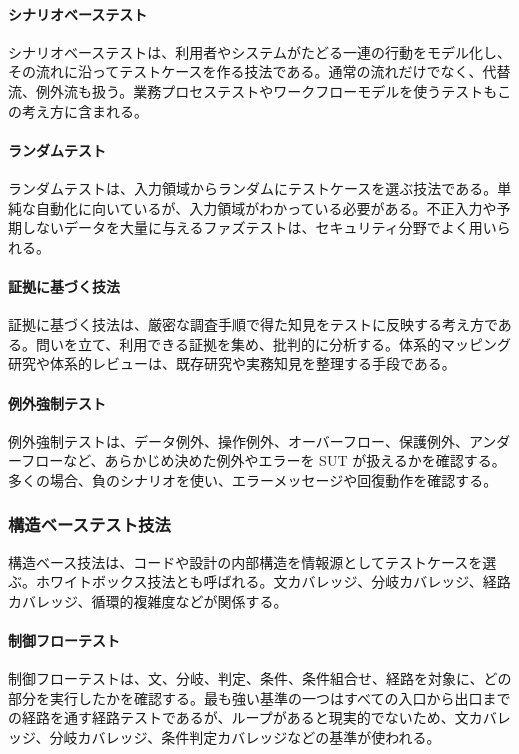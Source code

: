 \paragraph{シナリオベーステスト}
シナリオベーステストは、利用者やシステムがたどる一連の行動をモデル化し、その流れに沿ってテストケースを作る技法である。通常の流れだけでなく、代替流、例外流も扱う。業務プロセステストやワークフローモデルを使うテストもこの考え方に含まれる。

\paragraph{ランダムテスト}
ランダムテストは、入力領域からランダムにテストケースを選ぶ技法である。単純な自動化に向いているが、入力領域がわかっている必要がある。不正入力や予期しないデータを大量に与えるファズテストは、セキュリティ分野でよく用いられる。

\paragraph{証拠に基づく技法}
証拠に基づく技法は、厳密な調査手順で得た知見をテストに反映する考え方である。問いを立て、利用できる証拠を集め、批判的に分析する。体系的マッピング研究や体系的レビューは、既存研究や実務知見を整理する手段である。

\paragraph{例外強制テスト}
例外強制テストは、データ例外、操作例外、オーバーフロー、保護例外、アンダーフローなど、あらかじめ決めた例外やエラーを SUT が扱えるかを確認する。多くの場合、負のシナリオを使い、エラーメッセージや回復動作を確認する。

\subsubsection{構造ベーステスト技法}
構造ベース技法は、コードや設計の内部構造を情報源としてテストケースを選ぶ。ホワイトボックス技法とも呼ばれる。文カバレッジ、分岐カバレッジ、経路カバレッジ、循環的複雑度などが関係する。

\paragraph{制御フローテスト}
制御フローテストは、文、分岐、判定、条件、条件組合せ、経路を対象に、どの部分を実行したかを確認する。最も強い基準の一つはすべての入口から出口までの経路を通す経路テストであるが、ループがあると現実的でないため、文カバレッジ、分岐カバレッジ、条件判定カバレッジなどの基準が使われる。

